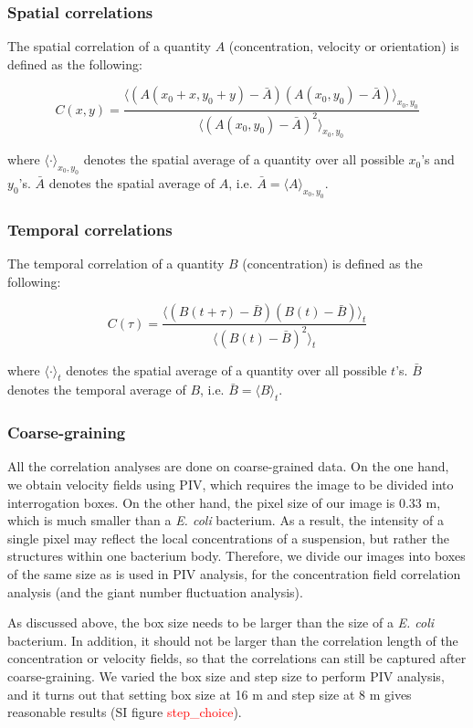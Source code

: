 \documentclass[twocolumn,aps,pre,amsmath,amssymb,floatfix,longbibliography]{revtex4-1}
\begin{document}
\subsubsection{Spatial correlations}

The spatial correlation of a quantity $A$ (concentration, velocity or orientation) is defined as the following:

$$ C(x, y) = \frac{\langle(A(x_0+x, y_0+y)-\bar A)(A(x_0, y_0)-\bar A) \rangle_{x_0, y_0}}{\langle(A(x_0, y_0)-\bar A)^2\rangle_{x_0, y_0}}$$

where $\langle\cdot\rangle_{x_0, y_0}$ denotes the spatial average of a quantity over all possible $x_0$'s and $y_0$'s.  $\bar A$ denotes the spatial average of $A$, i.e. $\bar A=\langle A\rangle_{x_0, y_0}$.

\subsubsection{Temporal correlations}
The temporal correlation of a quantity $B$ (concentration) is defined as the following:

$$ C(\tau) = \frac{\langle (B(t+\tau)-\bar B)(B(t)-\bar B)\rangle_t}{\langle(B(t)-\bar B)^2\rangle_t} $$

where $\langle\cdot\rangle_{t}$ denotes the spatial average of a quantity over all possible $t$'s.  $\bar B$ denotes the temporal average of $B$, i.e. $\bar B=\langle B\rangle_{t}$.

\subsubsection{Coarse-graining}
All the correlation analyses are done on coarse-grained data. On the one hand, we obtain velocity fields using PIV, which requires the image to be divided into interrogation boxes. On the other hand, the pixel size of our image is 0.33 \textmu m, which is much smaller than a \textit{E. coli} bacterium. As a result, the intensity of a single pixel may reflect the local concentrations of a suspension, but rather the structures within one bacterium body. Therefore, we divide our images into boxes of the same size as is used in PIV analysis, for the concentration field correlation analysis (and the giant number fluctuation analysis).

As discussed above, the box size needs to be larger than the size of a \textit{E. coli} bacterium. In addition, it should not be larger than the correlation length of the concentration or velocity fields, so that the correlations can still be captured after coarse-graining. We varied the box size and step size to perform PIV analysis, and it turns out that setting box size at 16 \textmu m and step size at 8 \textmu m gives reasonable results (SI figure \textcolor{red}{step\_choice}).
\end{document}
